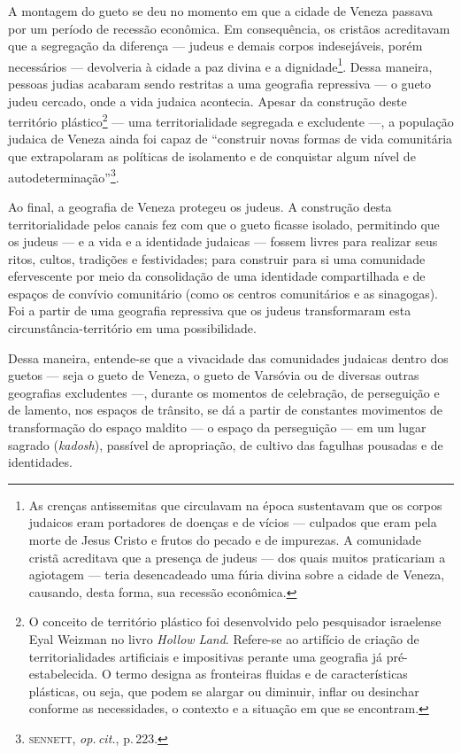 A montagem do gueto se deu no momento em que a cidade de Veneza passava
por um período de recessão econômica. Em consequência, os cristãos
acreditavam que a segregação da diferença --- judeus e demais corpos
indesejáveis, porém necessários --- devolveria à cidade a paz divina e a
dignidade\footnote{As crenças antissemitas que circulavam na época
  sustentavam que os corpos judaicos eram portadores de doenças e de
  vícios --- culpados que eram pela morte de Jesus Cristo e frutos do
  pecado e de impurezas. A comunidade cristã acreditava que a presença
  de judeus --- dos quais muitos praticariam a agiotagem --- teria
  desencadeado uma fúria divina sobre a cidade de Veneza, causando,
  desta forma, sua recessão econômica.}. Dessa maneira, pessoas judias
acabaram sendo restritas a uma geografia repressiva --- o gueto judeu
cercado, onde a vida judaica acontecia. Apesar da construção deste
território plástico\footnote{O conceito de território plástico foi
  desenvolvido pelo pesquisador israelense Eyal Weizman no livro
  \emph{Hollow Land}. Refere-se ao artifício de criação de
  territorialidades artificiais e impositivas perante uma geografia já
  pré-estabelecida. O termo designa as fronteiras fluidas e de
  características plásticas, ou seja, que podem se alargar ou diminuir,
  inflar ou desinchar conforme as necessidades, o contexto e a situação
  em que se encontram.} --- uma territorialidade segregada e excludente
---, a população judaica de Veneza ainda foi capaz de ``construir
novas formas de vida comunitária que extrapolaram as políticas de
isolamento e de conquistar algum nível de
autodeterminação''\footnote{\textsc{sennett}, \emph{op.\,cit.}, p.\,223.}.

Ao final, a geografia de Veneza protegeu os judeus. A construção desta
territorialidade pelos canais fez com que o gueto ficasse isolado,
permitindo que os judeus --- e a vida e a identidade judaicas --- fossem
livres para realizar seus ritos, cultos, tradições e festividades; para
construir para si uma comunidade efervescente por meio da consolidação
de uma identidade compartilhada e de espaços de convívio comunitário
(como os centros comunitários e as sinagogas). Foi a partir de uma
geografia repressiva que os judeus transformaram esta
circunstância-território em uma possibilidade.

Dessa maneira, entende-se que a vivacidade das comunidades judaicas
dentro dos guetos --- seja o gueto de Veneza, o gueto de Varsóvia ou de
diversas outras geografias excludentes ---, durante os momentos de
celebração, de perseguição e de lamento, nos espaços de trânsito, se dá
a partir de constantes movimentos de transformação do espaço maldito ---
o espaço da perseguição --- em um lugar sagrado (\emph{kadosh}),
passível de apropriação, de cultivo das fagulhas pousadas e de
identidades.

